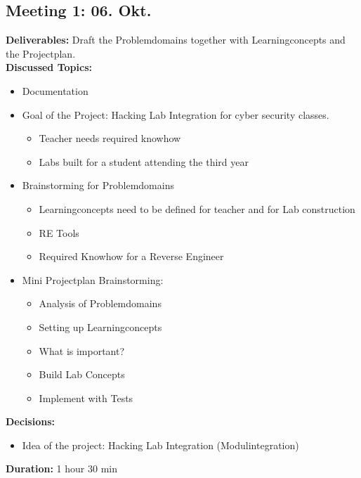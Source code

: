 \subsection*{Meeting 1: 06. Okt.}
\textbf{Deliverables:} Draft the Problemdomains together with Learningconcepts and the Projectplan. \\
\textbf{Discussed Topics:} 
\begin{itemize}
    \item Documentation
    \item Goal of the Project: Hacking Lab Integration for cyber security classes.
    \begin{itemize}
        \item Teacher needs required knowhow
        \item Labs built for a student attending the third year
    \end{itemize}
    \item Brainstorming for Problemdomains
    \begin{itemize}
        \item Learningconcepts need to be defined for teacher and for Lab construction
        \item RE Tools
        \item Required Knowhow for a Reverse Engineer
    \end{itemize}
    \item Mini Projectplan Brainstorming:
    \begin{itemize}
        \item Analysis of Problemdomains
        \item Setting up Learningconcepts
        \item What is important?
        \item Build Lab Concepts
        \item Implement with Tests
    \end{itemize}
\end{itemize}
\textbf{Decisions:} 
\begin{itemize}
    \item Idea of the project: Hacking Lab Integration (Modulintegration)
\end{itemize}
\textbf{Duration:} 1 hour 30 min

